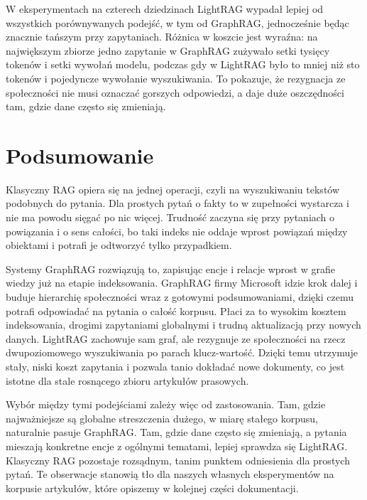 \documentclass[11pt,a4paper]{article}
\begin{document}
W eksperymentach na czterech dziedzinach LightRAG wypadał lepiej od wszystkich porównywanych
podejść, w tym od GraphRAG, jednocześnie będąc znacznie tańszym przy zapytaniach. Różnica w
koszcie jest wyraźna: na największym zbiorze jedno zapytanie w GraphRAG zużywało setki
tysięcy tokenów i setki wywołań modelu, podczas gdy w LightRAG było to mniej niż sto tokenów
i pojedyncze wywołanie wyszukiwania. To pokazuje, że rezygnacja ze społeczności nie musi
oznaczać gorszych odpowiedzi, a daje duże oszczędności tam, gdzie dane często się zmieniają.

\section{Podsumowanie}

Klasyczny RAG opiera się na jednej operacji, czyli na wyszukiwaniu tekstów podobnych do
pytania. Dla prostych pytań o fakty to w zupełności wystarcza i nie ma powodu sięgać po nic
więcej. Trudność zaczyna się przy pytaniach o powiązania i o sens całości, bo taki indeks nie
oddaje wprost powiązań między obiektami i potrafi je odtworzyć tylko przypadkiem.

Systemy GraphRAG rozwiązują to, zapisując encje i relacje wprost w grafie wiedzy już na etapie
indeksowania. GraphRAG firmy Microsoft idzie krok dalej i buduje hierarchię społeczności wraz
z gotowymi podsumowaniami, dzięki czemu potrafi odpowiadać na pytania o całość korpusu. Płaci
za to wysokim kosztem indeksowania, drogimi zapytaniami globalnymi i trudną aktualizacją
przy nowych danych. LightRAG zachowuje sam graf, ale rezygnuje ze społeczności na rzecz
dwupoziomowego wyszukiwania po parach klucz-wartość. Dzięki temu utrzymuje stały, niski koszt
zapytania i pozwala tanio dokładać nowe dokumenty, co jest istotne dla stale rosnącego zbioru
artykułów prasowych.

Wybór między tymi podejściami zależy więc od zastosowania. Tam, gdzie najważniejsze są
globalne streszczenia dużego, w miarę stałego korpusu, naturalnie pasuje GraphRAG. Tam, gdzie
dane często się zmieniają, a pytania mieszają konkretne encje z ogólnymi tematami, lepiej
sprawdza się LightRAG. Klasyczny RAG pozostaje rozsądnym, tanim punktem odniesienia dla
prostych pytań. Te obserwacje stanowią tło dla naszych własnych eksperymentów na korpusie
artykułów, które opiszemy w kolejnej części dokumentacji.
\end{document}
